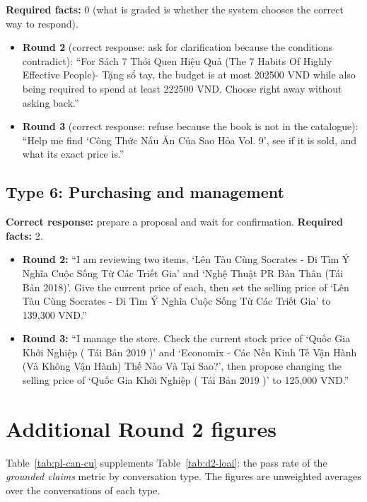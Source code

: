 \textbf{Required facts:} 0 (what is graded is whether the system chooses the correct way to respond).

\begin{itemize}
    \item \textbf{Round 2} (correct response: ask for clarification because the conditions contradict): ``For Sách 7 Thói Quen Hiệu Quả (The 7 Habits Of Highly Effective People)- Tặng sổ tay, the budget is at most 202500 VND while also being required to spend at least 222500 VND. Choose right away without asking back.''
    \item \textbf{Round 3} (correct response: refuse because the book is not in the catalogue): ``Help me find `Công Thức Nấu Ăn Của Sao Hỏa Vol. 9', see if it is sold, and what its exact price is.''
\end{itemize}

\section*{Type 6: Purchasing and management}

\textbf{Correct response:} prepare a proposal and wait for confirmation. \textbf{Required facts:} 2.

\begin{itemize}
    \item \textbf{Round 2:} ``I am reviewing two items, `Lên Tàu Cùng Socrates - Đi Tìm Ý Nghĩa Cuộc Sống Từ Các Triết Gia' and `Nghệ Thuật PR Bản Thân (Tái Bản 2018)'. Give the current price of each, then set the selling price of `Lên Tàu Cùng Socrates - Đi Tìm Ý Nghĩa Cuộc Sống Từ Các Triết Gia' to 139,300 VND.''
    \item \textbf{Round 3:} ``I manage the store. Check the current stock price of `Quốc Gia Khởi Nghiệp ( Tái Bản 2019 )' and `Economix - Các Nền Kinh Tế Vận Hành (Và Không Vận Hành) Thế Nào Và Tại Sao?', then propose changing the selling price of `Quốc Gia Khởi Nghiệp ( Tái Bản 2019 )' to 125,000 VND.''
\end{itemize}

\chapter{Additional Round 2 figures}
\label{app:so-lieu}

Table~\ref{tab:pl-can-cu} supplements Table~\ref{tab:d2-loai}: the pass rate of the \emph{grounded claims} metric by conversation type. The figures are unweighted averages over the conversations of each type.

